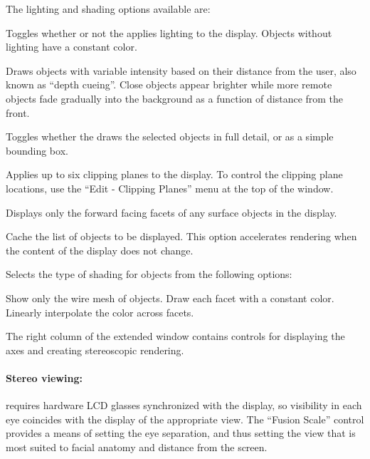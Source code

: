 The lighting and shading options available are:
%
\begin{description}
   Toggles whether or not the \viewer{} applies
  lighting to the display.  Objects without lighting have a constant
  color.
        
   Draws objects with variable intensity based on their
  distance from the user, also known as ``depth cueing''.  Close
  objects appear brighter while more remote objects fade gradually
  into the background as a function of distance from the front.
  
   Toggles whether the \viewer{} draws the selected
  objects in full detail, or as a simple bounding box.
  
   Applies up to six clipping planes to the
  display.  To control the clipping plane locations, use the ``Edit
  -\ra{} Clipping Planes'' menu at the top of the \viewer{} window.
  
   Displays only the forward facing facets of any
  surface objects in the display.
  
   Cache the list of objects to be displayed.
  This option accelerates rendering when the content of the display
  does not change.

   Selects the type of shading for objects from the
        following options:
        \begin{description}
           Show only the wire mesh of objects.
           Draw each facet with a constant color.
           Linearly interpolate the color across facets. 
        \end{description}
\end{description}

The right column of the extended \viewer{} window contains controls
for displaying the axes and creating stereoscopic rendering.  

\paragraph{Stereo viewing: } requires hardware LCD glasses synchronized
with the display, so visibility in each eye coincides with the
display of the appropriate view.  The ``Fusion Scale'' control provides a
means of setting the eye separation, and thus setting the view that is most
suited to facial anatomy and distance from the screen.

